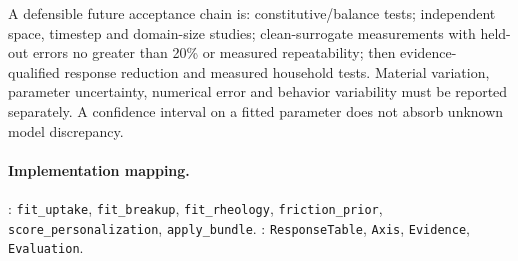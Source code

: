 A defensible future acceptance chain is: constitutive/balance tests; independent
space, timestep and domain-size studies; clean-surrogate measurements with
held-out errors no greater than 20\% or measured repeatability; then evidence-
qualified response reduction and measured household tests. Material variation,
parameter uncertainty, numerical error and behavior variability must be reported
separately. A confidence interval on a fitted parameter does not absorb unknown
model discrepancy.

\paragraph{Implementation mapping.}
: \nolinkurl{fit_uptake},
\nolinkurl{fit_breakup}, \nolinkurl{fit_rheology}, \nolinkurl{friction_prior},
\nolinkurl{score_personalization}, \nolinkurl{apply_bundle}.
: \nolinkurl{ResponseTable},
\nolinkurl{Axis}, \nolinkurl{Evidence}, \nolinkurl{Evaluation}.
